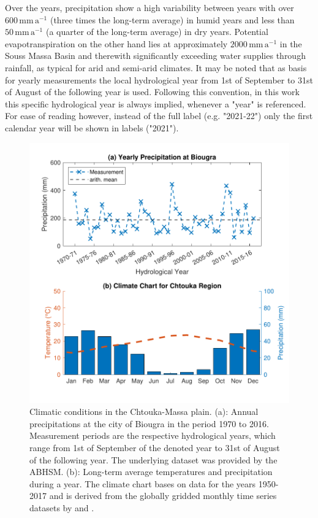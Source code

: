 Over the years, precipitation show a high variability between years with over $600 \, \textrm{mm} \, \textrm{a}^{-1}$ (three times the long-term average) in humid years and less than $50 \, \textrm{mm} \, \textrm{a}^{-1}$ (a quarter of the long-term average) in dry years. 
Potential evapotranspiration on the other hand lies at approximately $2000 \, \textrm{mm} \, \textrm{a}^{-1}$ in the Souss Massa Basin \parencite{Choukr.2017} and therewith significantly exceeding water supplies through rainfall, as typical for arid and semi-arid climates. 
It may be noted that as basis for yearly measurements the local hydrological year from 1st of September to 31st of August of the following year is used. 
Following this convention, in this work this specific hydrological year is always implied, whenever a "year" is referenced. 
For ease of reading however, instead of the full label (e.g. "2021-22") only the first calendar year will be shown in labels ("2021").

\begin{figure}[p]
    \centering
    \includegraphics[width=1.0\textwidth]{./img/Fig-PrecNClimateChtouka.pdf}
    \caption{Climatic conditions in the Chtouka-Massa plain. (a): Annual precipitations at the city of Biougra in the period 1970 to 2016. Measurement periods are the respective hydrological years, which range from 1st of September of the denoted year to 31st of August of the following year. The underlying dataset was provided by the ABHSM. (b): Long-term average temperatures and precipitation during a year. The climate chart bases on data for the years 1950-2017 and is derived from the globally gridded monthly time series datasets by \textcite{Matsuura.2018T} and \textcite{Matsuura.2018P}.}
    \label{Fig-ClimateChart}
\end{figure}


